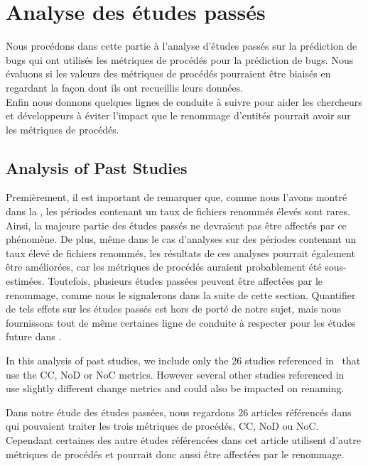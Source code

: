 \section{Analyse des études passés}
\label{sec:analyse}

Nous procédons dans cette partie à l’analyse d’études passés sur la prédiction de bugs qui ont utilisés les métriques de procédés pour la prédiction de bugs. Nous évaluons si les valeurs des métriques de procédés pourraient être biaisés en regardant la façon dont ils ont recueillis leurs données.\\
Enfin nous donnons quelques lignes de conduite à suivre pour aider les chercheurs et développeurs à éviter l’impact que le renommage d’entités pourrait avoir sur les métriques de procédés.  

\subsection{Analysis of Past Studies}

Premièrement, il est important de remarquer que, comme nous l'avons montré dans la , les périodes contenant un taux de fichiers renommés élevés sont rares. Ainsi, la majeure partie des études passés ne devraient pas être affectés par ce phénomène. De plus, même dans le cas d'analyses sur des périodes contenant un taux élevé de fichiers renommés, les résultats de ces analyses pourrait également être améliorées, car les métriques de procédés auraient probablement été sous-estimées. Toutefois, plusieurs études passées peuvent être affectées par le renommage, comme nous le signalerons dans la suite de cette section. Quantifier de tels effets sur les études passés est hors de porté de notre sujet, mais nous fournissons tout de même certaines ligne de conduite à respecter pour les études future dans .



In this analysis of past studies, we include only the 26 studies referenced in~\cite{radjenovic_software_2013} that use the CC, NoD or NoC metrics. However several other studies referenced in~\cite{radjenovic_software_2013} use slightly different change metrics and could also be impacted on renaming.

Dans notre étude des études passées, nous regardons 26 articles référencés dans ~\cite{radjenovic_software_2013} qui pouvaient traiter les trois métriques de procédés, CC, NoD ou NoC. Cependant certaines des autre études référencées dans cet article utilisent d'autre métriques de procédés et pourrait donc aussi être affectées par le renommage.\\

